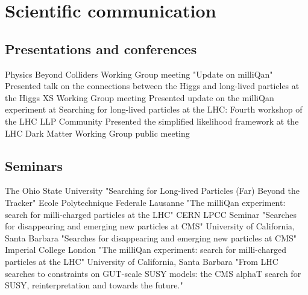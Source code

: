 %

\section{Scientific communication}
\subsection{Presentations and conferences}
 {Physics Beyond Colliders Working Group meeting "Update on milliQan"}
\vspace{0.1cm}
 {Presented talk on the connections between the Higgs and long-lived particles at the Higgs XS Working Group meeting}
\vspace{0.1cm}
 {Presented update on the milliQan experiment at Searching for long-lived particles at the LHC: Fourth workshop of the LHC LLP Community}
\vspace{0.1cm}
 {Presented the simplified likelihood framework at the LHC Dark Matter Working Group public meeting}
\vspace{0.1cm}
\vspace{0.1cm}
\vspace{0.1cm}
\vspace{0.1cm}
\subsection{Seminars}
 {The Ohio State University "Searching for Long-lived Particles (Far) Beyond the Tracker"}
\vspace{0.1cm}
 {Ecole Polytechnique Federale Lausanne "The milliQan experiment: search for milli-charged particles at the LHC"}
\vspace{0.1cm}
 {CERN LPCC Seminar "Searches for disappearing and emerging new particles at CMS"}
\vspace{0.1cm}
 {University of California, Santa Barbara "Searches for disappearing and emerging new particles at CMS"}
\vspace{0.1cm}
 {Imperial College London "The milliQan experiment: search for milli-charged particles at the LHC"}
\vspace{0.1cm}
 {University of California, Santa Barbara "From LHC searches to constraints on GUT-scale SUSY models: the CMS alphaT search for SUSY, reinterpretation and towards the future."}
\vspace{0.1cm}

